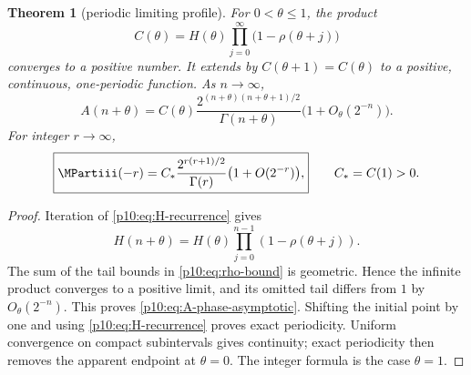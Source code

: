 \documentclass[11pt,oneside]{article}
\newtheorem{theorem}{Theorem}[section]
\theoremstyle{definition}
\theoremstyle{remark}
\newcommand{\1}{\mathbf 1}
\begin{document}
\begin{theorem}[periodic limiting profile]\label{p10:thm:phase-limit}
For \(0<\theta\le1\), the product
\begin{equation}\label{p10:eq:Ctheta-product}
 C(\theta)=H(\theta)
 \prod_{j=0}^{\infty}\bigl(1-\rho(\theta+j)\bigr)
\end{equation}
converges to a positive number.  It extends by \(C(\theta+1)=C(\theta)\) to a
positive, continuous, one-periodic function.  As \(n\to\infty\),
\begin{equation}\label{p10:eq:A-phase-asymptotic}
 A(n+\theta)=C(\theta)
 \frac{2^{(n+\theta)(n+\theta+1)/2}}{\Gamma(n+\theta)}
 \bigl(1+O_\theta(2^{-n})\bigr).
\end{equation}
For integer \(r\to\infty\),
\begin{equation}\label{p10:eq:integer-negative-asymptotic}
 \boxed{\displaystyle
 \MPartiii(-r)=C_*\frac{2^{r(r+1)/2}}{\Gamma(r)}
 \bigl(1+O(2^{-r})\bigr),}
 \qquad C_*=C(1)>0.
\end{equation}
\end{theorem}

\begin{proof}
Iteration of \cref{p10:eq:H-recurrence} gives
\[
 H(n+\theta)=H(\theta)
 \prod_{j=0}^{n-1}(1-\rho(\theta+j)).
\]
The sum of the tail bounds in \cref{p10:eq:rho-bound} is geometric.  Hence the infinite
product converges to a positive limit, and its omitted tail differs from \(1\) by
\(O_\theta(2^{-n})\).  This proves \cref{p10:eq:A-phase-asymptotic}.  Shifting the
initial point by one and using \cref{p10:eq:H-recurrence} proves exact periodicity.
Uniform convergence on compact subintervals gives continuity; exact periodicity
then removes the apparent endpoint at \(\theta=0\).
The integer formula is the case \(\theta=1\).
\end{proof}
\end{document}
